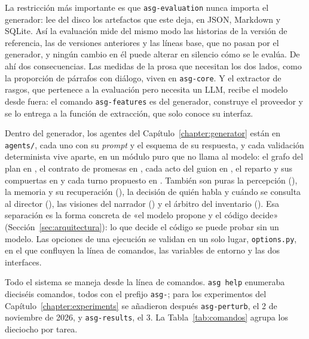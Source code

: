 La restricción más importante es que \texttt{asg-evaluation} nunca importa el generador: lee del
disco los artefactos que este deja, en JSON, Markdown y SQLite. Así la evaluación mide del mismo
modo las historias de la versión de referencia, las de versiones anteriores y las líneas base, que no
pasan por el generador, y ningún cambio en él puede alterar en silencio cómo se le evalúa. De ahí
dos consecuencias. Las medidas de la prosa que necesitan los dos lados, como la proporción de
párrafos con diálogo, viven en \texttt{asg-core}. Y el extractor de rasgos, que pertenece a la
evaluación pero necesita un LLM, recibe el modelo desde fuera: el comando \texttt{asg-features} es
del generador, construye el proveedor y se lo entrega a la función de extracción, que solo conoce su
interfaz.

Dentro del generador, los agentes del Capítulo~\ref{chapter:generator} están en \texttt{agents/},
cada uno con su \textit{prompt} y el esquema de su respuesta, y cada validación determinista vive
aparte, en un módulo puro que no llama al modelo: el grafo del plan en ,
el contrato de promesas en , cada acto del guion en
, el reparto y sus compuertas en  y cada turno
propuesto en . También son puras la percepción
(), la memoria y su recuperación (), la decisión
de quién habla y cuándo se consulta al director (), las visiones del narrador
() y el árbitro del inventario (). Esa separación
es la forma concreta de «el modelo propone y el código decide» (Sección~\ref{sec:arquitectura}): lo
que decide el código se puede probar sin un modelo. Las opciones de una ejecución se validan en un
solo lugar, \texttt{options.py}, en el que confluyen la línea de comandos, las variables de entorno y
las dos interfaces.

Todo el sistema se maneja desde la línea de comandos. \texttt{asg help} enumeraba dieciséis
comandos, todos con el prefijo \texttt{asg-}; para los experimentos del
Capítulo~\ref{chapter:experiments} se añadieron después \texttt{asg-perturb}, el 2 de noviembre de
2026, y \texttt{asg-results}, el 3. La Tabla~\ref{tab:comandos} agrupa los dieciocho por tarea.

